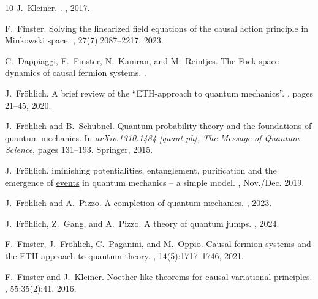 \documentclass[reqno,11pt]{amsart}
\numberwithin{equation}{section}
\newcommand{\1}{\mathds{1}}
\begin{document}
{{{\begin{thebibliography}{10}
J.~Kleiner.
.
,
  2017.

F.~Finster.
\newblock Solving the linearized field equations of the causal action principle
  in {M}inkowski space.
,
  27(7):2087--2217, 2023.

C.~Dappiaggi, F.~Finster, N.~Kamran, and M.~Reintjes.
\newblock The {F}ock space dynamics of causal fermion systems.
.

J.~Fr{\"o}hlich.
\newblock A brief review of the ``{ETH}-approach to quantum mechanics''.
, pages 21--45, 2020.

J.~Fr{\"o}hlich and B.~Schubnel.
\newblock Quantum probability theory and the foundations of quantum mechanics.
\newblock In {\em arXiv:1310.1484 [quant-ph], The Message of Quantum Science},
  pages 131--193. Springer, 2015.

J.~Fr{\"o}hlich.
iminishing potentialities, entanglement, purification and the
  emergence of \underline{events} in quantum mechanics -- a simple model.
, Nov./Dec. 2019.

J.~Fr\"ohlich and A.~Pizzo.
\newblock A completion of quantum mechanics.
, 2023.

J.~Fr\"ohlich, Z.~Gang, and A.~Pizzo.
\newblock A theory of quantum jumps.
, 2024.

F.~Finster, J.~Fr\"ohlich, C.~Paganini, and M.~Oppio.
\newblock Causal fermion systems and the {ETH} approach to quantum theory.
,
  14(5):1717--1746, 2021.

F.~Finster and J.~Kleiner.
\newblock Noether-like theorems for causal variational principles.
, 55:35(2):41, 2016.


\end{thebibliography}}}}
\end{document}

